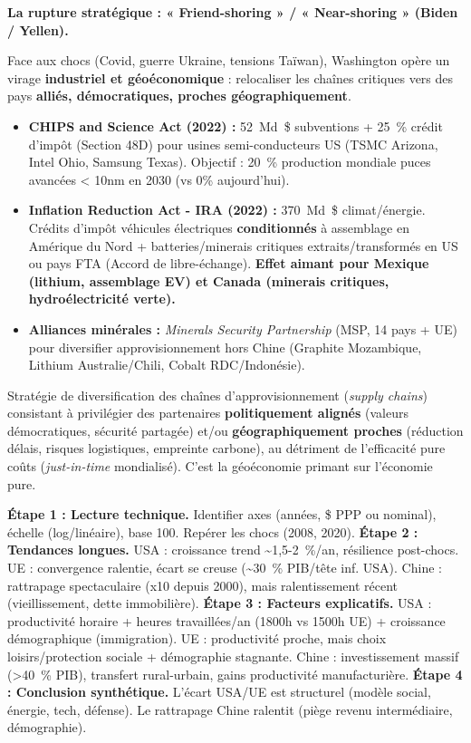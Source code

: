 \documentclass[11pt]{article}
\begin{document}
\textbf{La rupture stratégique : « Friend-shoring » / « Near-shoring » (Biden / Yellen).}\par
Face aux chocs (Covid, guerre Ukraine, tensions Taïwan), Washington opère un virage \textbf{industriel et géoéconomique} : relocaliser les chaînes critiques vers des pays \textbf{alliés, démocratiques, proches géographiquement}.
\begin{itemize}
\item \textbf{CHIPS and Science Act (2022) :} \SI{52}{Md\$} subventions + \SI{25}{\%} crédit d'impôt (Section 48D) pour usines semi-conducteurs US (TSMC Arizona, Intel Ohio, Samsung Texas). Objectif : \SI{20}{\%} production mondiale puces avancées < 10nm en 2030 (vs 0\% aujourd'hui).
\item \textbf{Inflation Reduction Act - IRA (2022) :} \SI{370}{Md\$} climat/énergie. Crédits d'impôt véhicules électriques \textbf{conditionnés} à assemblage en Amérique du Nord + batteries/minerais critiques extraits/transformés en US ou pays FTA (Accord de libre-échange). \rightarrow \textbf{Effet aimant pour Mexique (lithium, assemblage EV) et Canada (minerais critiques, hydroélectricité verte).}
\item \textbf{Alliances minérales :} \emph{Minerals Security Partnership} (MSP, 14 pays + UE) pour diversifier approvisionnement hors Chine (Graphite Mozambique, Lithium Australie/Chili, Cobalt RDC/Indonésie).
\end{itemize}

\begin{definition}
Stratégie de diversification des chaînes d'approvisionnement (\emph{supply chains}) consistant à privilégier des partenaires \textbf{politiquement alignés} (valeurs démocratiques, sécurité partagée) et/ou \textbf{géographiquement proches} (réduction délais, risques logistiques, empreinte carbone), au détriment de l'efficacité pure coûts (\emph{just-in-time} mondialisé). C'est la géoéconomie primant sur l'économie pure.
\end{definition}

\begin{methode}
\textbf{Étape 1 : Lecture technique.} Identifier axes (années, \$ PPP ou nominal), échelle (log/linéaire), base 100. Repérer les chocs (2008, 2020).
\textbf{Étape 2 : Tendances longues.} USA : croissance trend \SI{~1,5-2}{\%}/an, résilience post-chocs. UE : convergence ralentie, écart se creuse (\SI{~30}{\%} PIB/tête inf. USA). Chine : rattrapage spectaculaire (x10 depuis 2000), mais ralentissement récent (vieillissement, dette immobilière).
\textbf{Étape 3 : Facteurs explicatifs.} USA : productivité horaire + heures travaillées/an (\num{1 800}h vs \num{1 500}h UE) + croissance démographique (immigration). UE : productivité proche, mais choix loisirs/protection sociale + démographie stagnante. Chine : investissement massif (\SI{>40}{\%} PIB), transfert rural-urbain, gains productivité manufacturière.
\textbf{Étape 4 : Conclusion synthétique.} L'écart USA/UE est structurel (modèle social, énergie, tech, défense). Le rattrapage Chine ralentit (piège revenu intermédiaire, démographie).
\end{methode}
\end{document}
